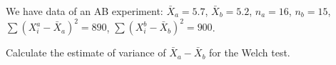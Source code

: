 
\begin{question}
We have data of an AB experiment: \(\bar X_a = 5.7\), \(\bar X_b = 5.2\),
\(n_a = 16\), \(n_b = 15\), \(\sum (X_i^a - \bar X_a)^2 = 890\),
\(\sum (X_i^b - \bar X_b)^2 = 900\).

Calculate the estimate of variance of \(\bar X_a - \bar X_b\) for the Welch test.


\end{question}


